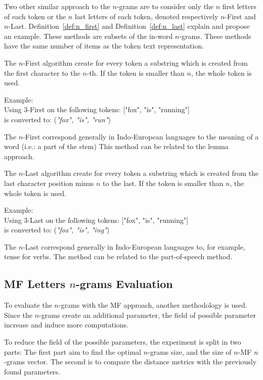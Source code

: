 Two other similar approach to the $n$-grams are to consider only the $n$ first letters of each token or the $n$ last letters of each token, denoted respectively $n$-First and $n$-Last.
Definition~\ref{def:n_first} and Definition~\ref{def:n_last} explain and propose an example.
These methods are subsets of the in-word $n$-grams.
These methods have the same number of items as the token text representation.

\begin{definition}
  The $n$-First algorithm create for every token a substring which is created from the first character to the $n$-th.
  If the token is smaller than $n$, the whole token is used.

  Example: \\
  Using $3$-First on the following tokens: ["fox", "is", "running"] \\
  is converted to: (\textit{"fox", "is", "run"})
\end{definition}

The $n$-First correspond generally in Indo-European languages to the meaning of a word (i.e.: a part of the stem)
This method can be related to the lemma approach.

\begin{definition}[$n$-Last]
  \label{def:n_last}
  The $n$-Last algorithm create for every token a substring which is created from the last character position minus $n$ to the last.
  If the token is smaller than $n$, the whole token is used.

  Example: \\
  Using $3$-Last on the following tokens: ["fox", "is", "running"] \\
  is converted to: (\textit{"fox", "is", "ing"})
\end{definition}

The $n$-Last correspond generally in Indo-European languages to, for example, tense for verbs.
The method can be related to the part-of-speech method.

\subsection{MF Letters $n$-grams Evaluation}

To evaluate the $n$-grams with the MF approach, another methodology is used.
Since the $n$-grams create an additional parameter, the field of possible parameter increase and induce more computations.

To reduce the field of the possible parameters, the experiment is split in two parts:
The first part aim to find the optimal $n$-grams size, and the size of $n$-MF $n$-grams vector.
The second is to compare the distance metrics with the previously found parameters.

